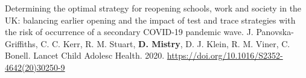 \begin{cventries}
  \cvpublicationentrytwo
    {Determining the optimal strategy for reopening schools, work and society in the UK: balancing earlier opening and the impact of test and trace strategies with the risk of occurrence of a secondary COVID-19 pandemic wave.} %
    {J. Panovska-Griffiths, C. C. Kerr, R. M. Stuart, \textbf{D. Mistry}, D. J. Klein, R. M. Viner, C. Bonell.} %
    {Lancet Child Adolesc Health.} %
    {} %
    {} %
    {} %
    {2020.} %
    {} %
    {\href{https://doi.org/10.1016/S2352-4642(20)30250-9}{https://doi.org/10.1016/S2352-4642(20)30250-9 \faLink\acvHeaderIconSep}} %
    \vspace{.5mm}





\end{cventries}

